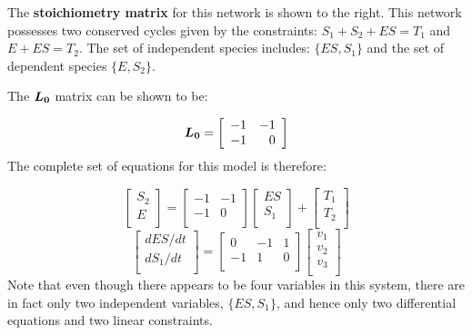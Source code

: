 \begin{boxedminipage}[hbp]{14cm}
\vspace{12pt} The {\bfseries stoichiometry matrix} for this
network is shown to the right. This network possesses two
conserved cycles given by the constraints: $S_1 + S_2 + ES = T_1$
and $E + ES = T_2$. The set of independent species includes:
$\{ES, S_1\}$ and the set of dependent species $\{E, S_2 \}$.

\bigskip
The $\mbox{\boldmath $L_0$}$ matrix can be shown to be:

\hspace{2cm} $$ \mbox{\boldmath $L_0$} = \left[ \begin{array}{rr}
    -1 & -1 \\
    -1 & 0 \\
\end{array}  \right]$$ \hfill
%
\linebreak
The complete set of equations for this model is therefore:

$$
\left[ \begin{array}{l}
    S_2 \\
    E \\
\end{array} \right] =
\left[ \begin{array}{rr}
    -1 & -1 \\
    -1 & 0 \\
\end{array}  \right]
\left[
\begin{array}{l}
        ES \\
        S_1 \\
\end{array}
\right] +
\left[
\begin{array}{l}
    T_1 \\
    T_2 \\
\end{array}
\right]$$
$$\left[
\begin{array}{l}
    dES/dt \\
    dS_1/dt \\
\end{array}
\right] =
\left[
\begin{array}{rrr}
    0 & -1 & 1 \\
    -1 & 1 & 0 \\
\end{array}
\right]
\left[
\begin{array}{l}
    v_1 \\
    v_2 \\
    v_3 \\
\end{array}
\right]$$ Note that even though there appears to be four variables
in this system, there are in fact only two independent variables, $\{ES, S_1\}$,
and hence only two differential equations and two linear constraints.

\end{boxedminipage}

